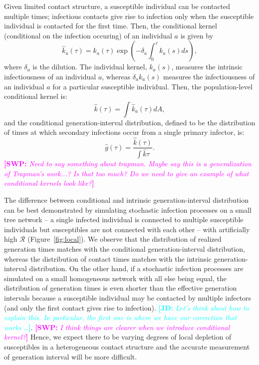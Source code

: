 \documentclass{article}
\newcommand{\RR}{\ensuremath{{\mathcal R}}}
\newcommand{\comment}[3]{\textcolor{#1}{\textbf{[#2: }\textsl{#3}\textbf{]}}}
\newcommand{\jd}[1]{\comment{cyan}{JD}{#1}}
\newcommand{\swp}[1]{\comment{magenta}{SWP}{#1}}
\begin{document}
Given limited contact structure, a susceptible individual can be contacted multiple times;
infectious contacts give rise to infection only when the susceptible individual is contacted for the first time.
Then, the conditional kernel (conditional on the infection occuring) of an individual $a$ is given by
\begin{equation}
\hat{k}_a(\tau) = k_a(\tau) \exp \left(- \delta_a \int_0^\tau k_a(s) ds\right),
\end{equation}
where $\delta_a$ is the dilution.
The individual kernel, $k_a(s)$, measures the intrinsic infectiousness of an individual $a$,
whereas $\delta_a k_a(s)$ measures the infectiousness of an individual $a$ for a particular susceptible individual.
Then, the population-level conditional kernel is:
\begin{equation}
\hat{k}(\tau) = \int \hat{k}_a(\tau) dA,
\end{equation}
and the conditional generation-interval distribution, defined to be the distribution of times at which secondary infections occur from a single primary infector, is:
\begin{equation}
\hat{g}(\tau) = \frac{\hat{k}(\tau)}{\int \hat{k} \tau}.
\end{equation}
\swp{Need to say something about trapman. Maybe say this is a generalization of Trapman's work...? Is that too much? Do we need to give an example of what conditional kernels look like?}

The difference between conditional and intrinsic generation-interval distribution can be best demonstrated by simulating stochastic infection processes on a small tree network -- a single infected individual is connected to multiple susceptible individuals but susceptibles are not connected with each other -- with artificially high $\RR$ (Figure~\ref{fig:local}).
We observe that the distribution of realized generation times matches with the conditional generation-interval distribution, whereas the distribution of contact times matches with the intrinsic generation-interval distribution.
On the other hand, if a stochastic infection processes are simulated on a small homogeneous network with all else being equal, the distribution of generation times is even shorter than the effective generation intervals because a susceptible individual may be contacted by multiple infectors (and only the first contact gives rise to infection).
\jd{Let's think about how to explain this. In particular, the first one is where we have our correction that works \ldots}.
\swp{I think things are clearer when we introduce conditional kernel?}
Hence, we expect there to be varying degrees of local depletion of susceptibles in a heterogeneous contact structure and the accurate measurement of generation interval will be more difficult.
\end{document}
